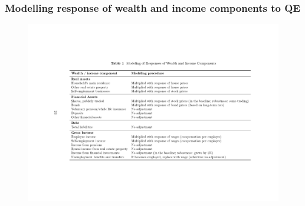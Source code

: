 \documentclass[pdflatex,aspectratio=169]{beamer}
\begin{document}

\begin{frame}\frametitle{\bf Modelling response of wealth and income components to QE \hypertarget{DetailedWealth}{}
\hyperlink{WealthSim}{}
}

\begin{figure}
\begin{center}
\includegraphics[width=1\textwidth]{./figures/wealthSimulation}
\end{center}
\end{figure}

\end{frame}
\end{document}
